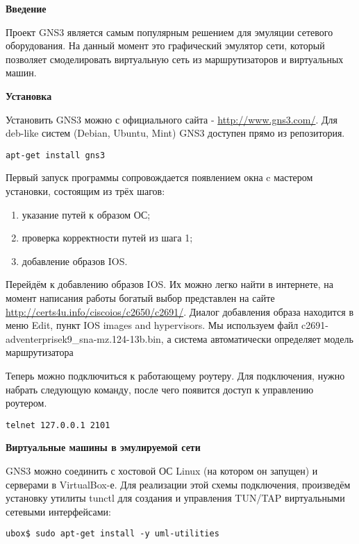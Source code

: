 \documentclass[a4paper, 12pt]{article}		%
\begin{document}


\textbf{Введение}

Проект GNS3 является самым популярным решением для эмуляции сетевого оборудования. На данный момент это графический эмулятор сети, который позволяет смоделировать виртуальную сеть из маршрутизаторов и виртуальных машин.

\textbf{Установка}

Установить GNS3 можно с официального сайта - \url{http://www.gns3.com/}. Для deb-like систем (Debian, Ubuntu, Mint) GNS3 доступен прямо из репозитория.

\begin{Verbatim}[frame=single]
apt-get install gns3
\end{Verbatim}

Первый запуск программы сопровождается появлением окна c мастером установки, состоящим из трёх шагов:
\begin{enumerate}
  \item указание путей к образом ОС;
  \item проверка корректности путей из шага 1;
  \item добавление образов IOS.
\end{enumerate}

Перейдём к добавлению образов IOS. Их можно легко найти в интернете, на момент написания работы богатый выбор представлен на сайте \url{http://certs4u.info/ciscoios/c2650/c2691/}. Диалог добавления образа находится в меню Edit, пункт IOS images and hypervisors. Мы используем файл c2691-adventerprisek9\_sna-mz.124-13b.bin, а система автоматически определяет модель маршрутизатора 

Теперь можно подключиться к работающему роутеру. Для подключения, нужно набрать следующую команду, после чего появится доступ к управлению роутером.
\begin{Verbatim}[frame=single]
telnet 127.0.0.1 2101
\end{Verbatim}

\textbf{Виртуальные машины в эмулируемой сети}

GNS3 можно соединить с хостовой ОС Linux (на котором он запущен) и серверами в VirtualBox-е. Для реализации этой схемы подключения, произведём установку утилиты tunctl для создания и управления TUN/TAP виртуальными сетевыми интерфейсами:

\begin{Verbatim}[frame=single]
ubox$ sudo apt-get install -y uml-utilities
\end{Verbatim}
\end{document}
